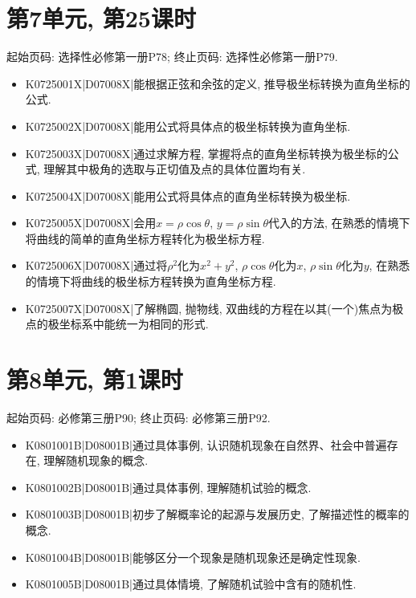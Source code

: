 \section*{第7单元, 第25课时}
起始页码: 选择性必修第一册P78; 终止页码: 选择性必修第一册P79.
\begin{itemize}
\item K0725001X|D07008X|能根据正弦和余弦的定义, 推导极坐标转换为直角坐标的公式.
\item K0725002X|D07008X|能用公式将具体点的极坐标转换为直角坐标.
\item K0725003X|D07008X|通过求解方程, 掌握将点的直角坐标转换为极坐标的公式, 理解其中极角的选取与正切值及点的具体位置均有关.
\item K0725004X|D07008X|能用公式将具体点的直角坐标转换为极坐标.
\item K0725005X|D07008X|会用$x=\rho \cos\theta$, $y=\rho \sin \theta$代入的方法, 在熟悉的情境下将曲线的简单的直角坐标方程转化为极坐标方程.
\item K0725006X|D07008X|通过将$\rho^2$化为$x^2+y^2$, $\rho\cos\theta$化为$x$, $\rho\sin\theta$化为$y$, 在熟悉的情境下将曲线的极坐标方程转换为直角坐标方程.
\item K0725007X|D07008X|了解椭圆, 抛物线, 双曲线的方程在以其(一个)焦点为极点的极坐标系中能统一为相同的形式.
\end{itemize}

\section*{第8单元, 第1课时}
起始页码: 必修第三册P90; 终止页码: 必修第三册P92.
\begin{itemize}
\item K0801001B|D08001B|通过具体事例, 认识随机现象在自然界、社会中普遍存在, 理解随机现象的概念.
\item K0801002B|D08001B|通过具体事例, 理解随机试验的概念.
\item K0801003B|D08001B|初步了解概率论的起源与发展历史, 了解描述性的概率的概念.
\item K0801004B|D08001B|能够区分一个现象是随机现象还是确定性现象.
\item K0801005B|D08001B|通过具体情境, 了解随机试验中含有的随机性.
\end{itemize}

